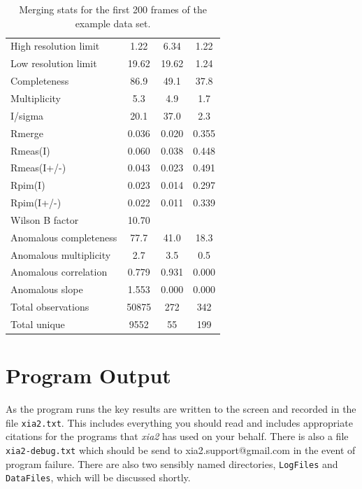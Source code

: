 \documentclass[a4paper, 11pt]{article}
\begin{document}
\begin{table}
\caption{Merging stats for the first 200 frames of the example data set.
\label{table-merging-sub}}
\begin{tabular}{lccc}
High resolution limit         &         1.22 &  6.34 &  1.22 \\
Low resolution limit          &        19.62 & 19.62 &  1.24 \\
Completeness                  &         86.9 &  49.1 &  37.8 \\
Multiplicity                  &        5.3  &  4.9   & 1.7 \\
I/sigma                       &        20.1 &  37.0  &  2.3 \\
Rmerge                        &       0.036 & 0.020  &0.355 \\
Rmeas(I)                      &       0.060 & 0.038  &0.448 \\
Rmeas(I+/-)                   &       0.043 & 0.023  &0.491 \\
Rpim(I)                       &       0.023 & 0.014  &0.297 \\
Rpim(I+/-)                    &       0.022 & 0.011  &0.339 \\
Wilson B factor               &       10.70& \\
Anomalous completeness        &        77.7  & 41.0  & 18.3 \\
Anomalous multiplicity        &         2.7  &  3.5  &  0.5 \\
Anomalous correlation         &        0.779 & 0.931 & 0.000 \\
Anomalous slope               &       1.553  &0.000 & 0.000 \\
Total observations            &       50875  &272   & 342 \\
Total unique                  &       9552   &55    & 199 \\
\end{tabular}
\end{table}

\section{Program Output}

As the program runs the key results are written to the screen and recorded
in the file \verb|xia2.txt|. This includes everything you should read and
includes appropriate citations for the programs that \emph{xia2} has used
on your behalf. There is also a file \verb|xia2-debug.txt| 
which should be send to 
xia2.support@gmail.com in the event of program failure. There are also two 
sensibly named directories, \verb|LogFiles| and \verb|DataFiles|, which will
be discussed shortly.
\end{document}
